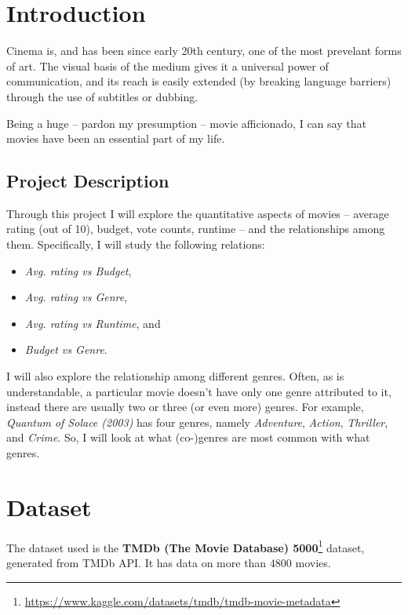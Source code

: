 \documentclass[10pt]{article}
\begin{document}
\begin{multicols}{2}

\section{Introduction}

Cinema is, and has been since early 20th century, one of the most prevelant forms of art. 
The visual basis of the medium gives it a universal power of communication, 
and its reach is easily extended (by breaking language barriers) through the use of subtitles or dubbing.

Being a huge -- pardon my presumption -- movie afficionado, I can say that movies have been an essential part of my life.

\subsection{Project Description}
Through this project I will explore the quantitative aspects of movies -- 
average rating (out of 10), budget, vote counts, runtime -- 
and the relationships among them.
Specifically, I will study the following relations:  
\begin{itemize}
    \item \emph{Avg. rating vs Budget}, 
    \item \emph{Avg. rating vs Genre}, 
    \item \emph{Avg. rating vs Runtime}, and
    \item \emph{Budget vs Genre}.
\end{itemize}

I will also explore the relationship among different genres. 
Often, as is understandable, a particular movie doesn't have only one genre attributed to it, instead there are usually two or three (or even more) genres. 
For example, \emph{Quantum of Solace (2003)} has four genres, namely \emph{Adventure}, \emph{Action}, \emph{Thriller}, and \emph{Crime}.
So, I will look at what (co-)genres are most common with what genres. 



\section{Dataset}

The dataset used is the \textbf{TMDb (The Movie Database) 5000}\footnote{\url{https://www.kaggle.com/datasets/tmdb/tmdb-movie-metadata}} dataset, generated from TMDb API.
It has data on more than 4800 movies.


\end{multicols}
\end{document}
